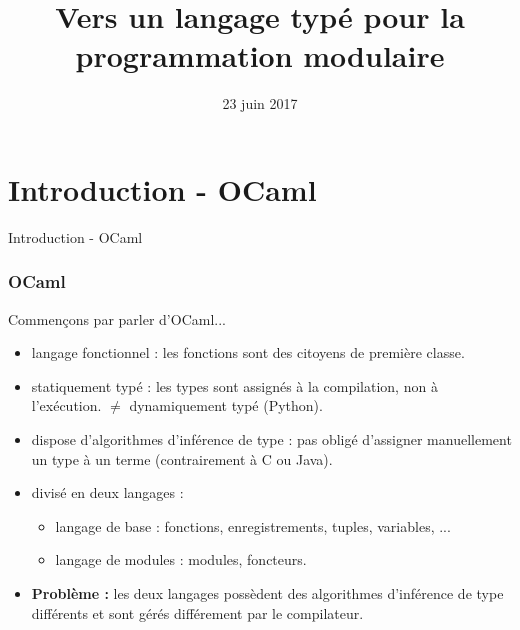 \documentclass{beamer}
\begin{document}
\title{Vers un langage typé pour la programmation modulaire}
\date{23 juin 2017}

\maketitle

\begin{frame}
	\tableofcontents
\end{frame}

\section{Introduction - OCaml}

\begin{frame}
	\begin{center}
		\Huge{Introduction - OCaml}
	\end{center}
\end{frame}

\begin{frame}
  \frametitle{OCaml}
  Commençons par parler d'OCaml...
	\begin{center}
    \begin{itemize}
    \item langage fonctionnel : les fonctions sont des citoyens de première classe.
    \item statiquement typé : les types sont assignés à la compilation, non à
      l'exécution. $\neq$ dynamiquement typé (Python).
    \item dispose d'algorithmes d'inférence de type : pas obligé d'assigner
      manuellement un type à un terme (contrairement à C ou Java).
    \item divisé en deux \og langages \fg :
      \begin{itemize}
      \item langage de base : fonctions, enregistrements, tuples, variables, ...
      \item langage de modules : modules, foncteurs.
      \end{itemize}
    \item \textbf{Problème : }les deux langages possèdent des algorithmes d'inférence de type
      différents et sont gérés différement par le compilateur.
    \end{itemize}
	\end{center}
\end{frame}

%
\end{document}
